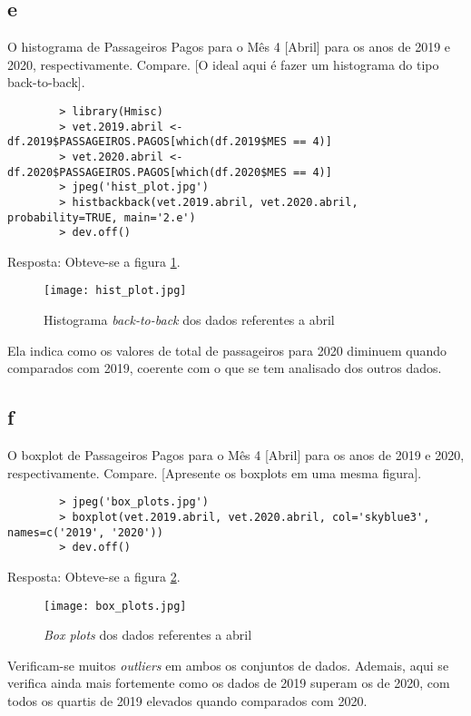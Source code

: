 \documentclass{article}[twocolumn]
\begin{document}
	\subsection{e}
	O histograma de Passageiros Pagos para o Mês 4 [Abril] para os anos de 2019 e 2020,
	respectivamente. Compare. [O ideal aqui é fazer um histograma do tipo back-to-back].
	\begin{verbatim}
		> library(Hmisc)
		> vet.2019.abril <- df.2019$PASSAGEIROS.PAGOS[which(df.2019$MES == 4)]
		> vet.2020.abril <- df.2020$PASSAGEIROS.PAGOS[which(df.2020$MES == 4)]
		> jpeg('hist_plot.jpg')
		> histbackback(vet.2019.abril, vet.2020.abril, probability=TRUE, main='2.e')
		> dev.off()
	\end{verbatim}
	Resposta: Obteve-se a figura \ref{fig:backtoback}.
	\begin{figure}[H]
		\centering
		\texttt{[image: hist\_plot.jpg]}
		\caption{Histograma \textit{back-to-back} dos dados referentes a abril}
		\label{fig:backtoback}
	\end{figure}
	Ela indica como os valores de total de passageiros para 2020 diminuem quando comparados
	com 2019, coerente com o que se tem analisado dos outros dados.
	\subsection{f}
	O boxplot de Passageiros Pagos para o Mês 4 [Abril] para os anos de 2019 e 2020,
	respectivamente. Compare. [Apresente os boxplots em uma mesma figura].
	\begin{verbatim}
		> jpeg('box_plots.jpg')
		> boxplot(vet.2019.abril, vet.2020.abril, col='skyblue3', names=c('2019', '2020'))
		> dev.off()
	\end{verbatim}
	Resposta: Obteve-se a figura \ref{fig:boxplots}.
	\begin{figure}[H]
		\centering
		\texttt{[image: box\_plots.jpg]}
		\caption{\textit{Box plots} dos dados referentes a abril}
		\label{fig:boxplots}
	\end{figure}
	Verificam-se muitos \textit{outliers} em ambos os conjuntos de dados. Ademais, aqui se verifica
	ainda mais fortemente como os dados de 2019 superam os de 2020, com todos os quartis de 2019
	elevados quando comparados com 2020.
\end{document}
